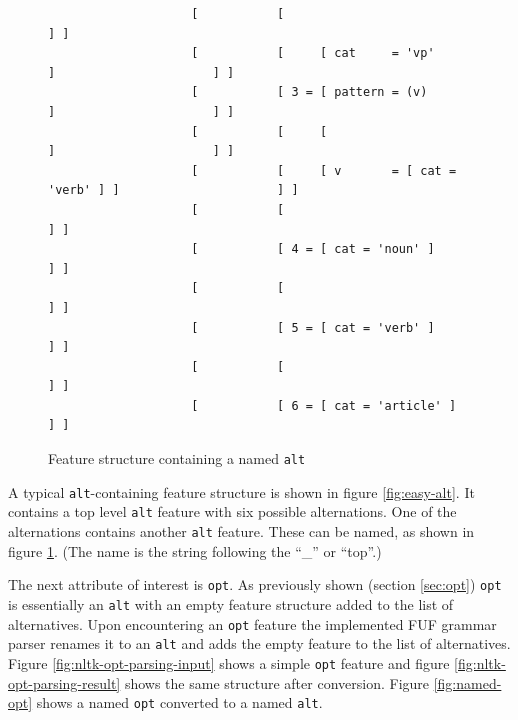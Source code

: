 \documentclass[12pt]{article}
\begin{document}
{\begin{figure}[h!]
{\begin{verbatim}
                    [           [                                                         ] ]
                    [           [     [ cat     = 'vp'             ]                      ] ]
                    [           [ 3 = [ pattern = (v)              ]                      ] ]
                    [           [     [                            ]                      ] ]
                    [           [     [ v       = [ cat = 'verb' ] ]                      ] ]
                    [           [                                                         ] ]
                    [           [ 4 = [ cat = 'noun' ]                                    ] ]
                    [           [                                                         ] ]
                    [           [ 5 = [ cat = 'verb' ]                                    ] ]
                    [           [                                                         ] ]
                    [           [ 6 = [ cat = 'article' ]                                 ] ]
\end{verbatim}
}
\caption{Feature structure containing a named \texttt{alt}}
\label{fig:nltk-named-alt}
\end{figure}

\pagebreak

A typical \texttt{alt}-containing feature structure is shown in figure \ref{fig:easy-alt}.
It contains a top level \texttt{alt} feature with six possible alternations. One of the alternations
contains another \texttt{alt} feature.
These can be named, as shown in figure \ref{fig:nltk-named-alt}.
(The name is the string following the ``\_'' or ``top''.)

The next attribute of interest is \texttt{opt}. As previously shown (section \ref{sec:opt}) \texttt{opt} is essentially an \texttt{alt}
with an empty feature structure added to the list of alternatives. 
Upon encountering an \texttt{opt} feature the implemented FUF grammar parser renames it to an \texttt{alt} and
adds the empty feature to the list of alternatives.
Figure \ref{fig:nltk-opt-parsing-input} shows a simple \texttt{opt} feature and figure 
\ref{fig:nltk-opt-parsing-result} shows the same structure after conversion.
Figure \ref{fig:named-opt} shows a named \texttt{opt} converted to a named \texttt{alt}.

}
\end{document}
